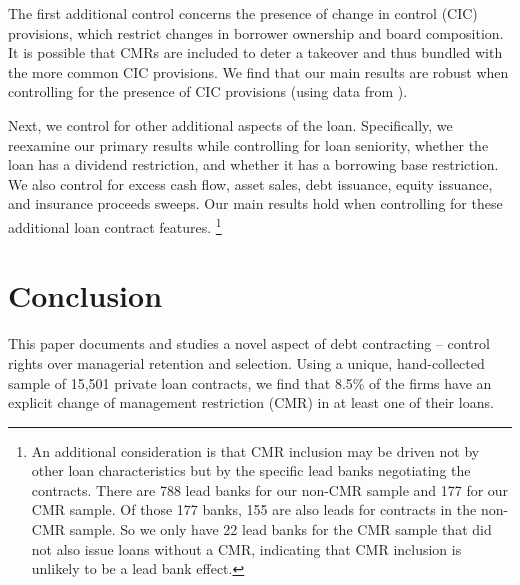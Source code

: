 \documentclass[a4paper,12pt]{article}
\begin{document}
The first additional control concerns the presence of change in control (CIC) provisions, which restrict changes in borrower ownership and board composition.
It is possible that CMRs are included to deter a takeover and thus bundled with the more common CIC provisions.
We find that our main results are robust when controlling for the presence of CIC provisions (using data from \cite{akins_2019}).


Next, we control for other additional aspects of the loan.
Specifically, we reexamine our primary results while controlling for loan seniority, whether the loan has a dividend restriction, and whether it has a borrowing base restriction. 
We also control for excess cash flow, asset sales, debt issuance, equity issuance, and insurance proceeds sweeps.
Our main results hold when controlling for these additional loan contract features.%
    \footnote{An additional consideration is that CMR inclusion may be driven not by other loan characteristics but by the specific lead banks negotiating the contracts.
    There are 788 lead banks for our non-CMR sample and 177 for our CMR sample.
    Of those 177 banks, 155 are also leads for contracts in the non-CMR sample.
    So we only have 22 lead banks for the CMR sample that did not also issue loans without a CMR, indicating that CMR inclusion is unlikely to be a lead bank effect.}








\section{Conclusion}
\label{section:conclusion}

This paper documents and studies a novel aspect of debt contracting -- control rights over managerial retention and selection.
Using a unique, hand-collected sample of 15,501 private loan contracts, we find that 8.5\% of the firms have an explicit change of management restriction (CMR) in at least one of their loans.
\end{document}
